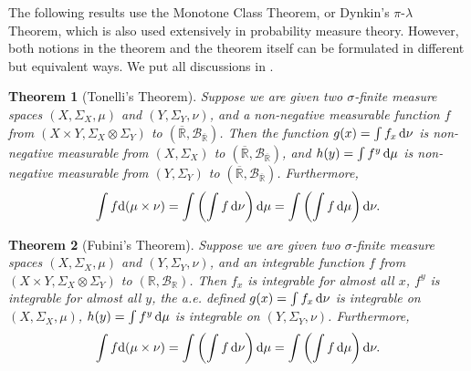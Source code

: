 \documentclass[openany]{book}
\newtheorem{theorem}{Theorem}[chapter]
\theoremstyle{definition}
\theoremstyle{remark}
\begin{document}
The following results use the Monotone Class Theorem, or Dynkin's $\pi$-$\lambda$ Theorem, which is also used extensively in probability measure theory. However, both notions in the theorem and the theorem itself can be formulated in different but equivalent ways. We put all discussions in .

\begin{theorem}[Tonelli's Theorem]
    Suppose we are given two $\sigma$-finite measure spaces $(X,\Sigma_X,\mu)$ and $(Y,\Sigma_Y,\nu)$, and a non-negative measurable function $f$ from $(X\times Y,\Sigma_X\otimes\Sigma_Y)$ to $(\overline{\mathbb{R}},\mathcal{B}_{\overline{\mathbb{R}}})$. Then the function $g(x)=\int f_x \dif\nu$ is non-negative measurable from $(X,\Sigma_X)$ to $(\overline{\mathbb{R}},\mathcal{B}_{\overline{\mathbb{R}}})$, and $h(y)=\int f^y \dif\mu$ is non-negative measurable from $(Y,\Sigma_Y)$ to $(\overline{\mathbb{R}},\mathcal{B}_{\overline{\mathbb{R}}})$. Furthermore,
    \begin{equation*}
        \int f \mathrm{d}(\mu\times\nu)=\int\left(\int f \dif\nu\right)\dif\mu=\int\left(\int f \dif\mu\right)\dif\nu.
    \end{equation*}
\end{theorem}
\begin{theorem}[Fubini's Theorem]
    Suppose we are given two $\sigma$-finite measure spaces $(X,\Sigma_X,\mu)$ and $(Y,\Sigma_Y,\nu)$, and an integrable function $f$ from $(X\times Y,\Sigma_X\otimes\Sigma_Y)$ to $(\mathbb{R},\mathcal{B}_{\mathbb{R}})$. Then $f_x$ is integrable for almost all $x$, $f^y$ is integrable for almost all $y$, the a.e. defined $g(x)=\int f_x \dif\nu$ is integrable on $(X,\Sigma_X,\mu)$, $h(y)=\int f^y \dif\mu$ is integrable on $(Y,\Sigma_Y,\nu)$. Furthermore,
    \begin{equation*}
        \int f \mathrm{d}(\mu\times\nu)=\int\left(\int f \dif\nu\right)\dif\mu=\int\left(\int f \dif\mu\right)\dif\nu.
    \end{equation*}
\end{theorem}
\end{document}
